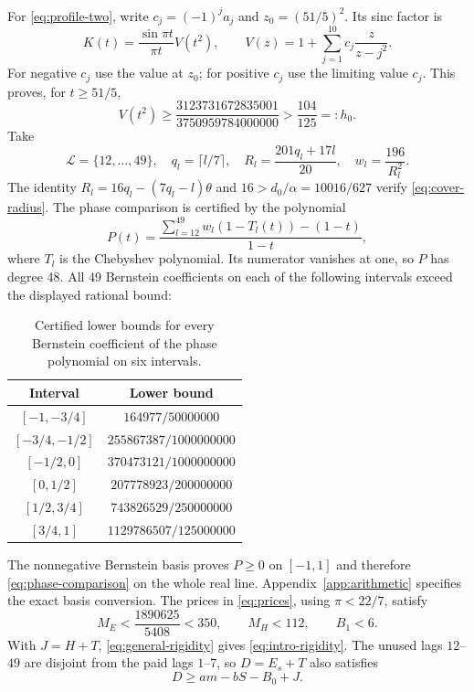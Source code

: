 \documentclass[11pt,reqno]{amsart}
\numberwithin{equation}{section}
\begin{document}
For \eqref{eq:profile-two}, write $c_j=(-1)^ja_j$ and
$z_0=(51/5)^2$. Its sinc factor is
\[
 K(t)=\frac{\sin\pi t}{\pi t}V(t^2),\qquad
 V(z)=1+\sum_{j=1}^{10}c_j\frac{z}{z-j^2}.
\]
For negative $c_j$ use the value at $z_0$; for positive $c_j$ use
the limiting value $c_j$. This proves, for $t\ge51/5$,
\begin{equation}
 V(t^2)\ge\frac{3123731672835001}{3750959784000000}
 >\frac{104}{125}=:h_0.
 \label{eq:tail-factor}
\end{equation}
Take
\begin{equation}
 \mathcal L=\{12,\ldots,49\},\quad q_l=\lceil l/7\rceil,\quad
 R_l=\frac{201q_l+17l}{20},\quad
 w_l=\frac{196}{R_l^2}.
 \label{eq:lag-data}
\end{equation}
The identity $R_l=16q_l-(7q_l-l)\theta$ and
$16>d_0/\alpha=10016/627$ verify \eqref{eq:cover-radius}.
The phase comparison is certified by the polynomial
\begin{equation}
 P(t)=\frac{\sum_{l=12}^{49}w_l(1-T_l(t))-(1-t)}{1-t},
 \label{eq:phase-polynomial}
\end{equation}
where $T_l$ is the Chebyshev polynomial. Its numerator vanishes at one,
so $P$ has degree 48. All 49 Bernstein coefficients on each of the
following intervals exceed the displayed rational bound:
\begin{table}[htbp]
\centering
\caption{Certified lower bounds for every Bernstein coefficient of the
phase polynomial on six intervals.}
\label{tab:phase-bounds}
\begin{tabular}{cc}
\toprule Interval & Lower bound\\\midrule
$[-1,-3/4]$ & $164977/50000000$\\
$[-3/4,-1/2]$ & $255867387/1000000000$\\
$[-1/2,0]$ & $370473121/1000000000$\\
$[0,1/2]$ & $207778923/200000000$\\
$[1/2,3/4]$ & $743826529/250000000$\\
$[3/4,1]$ & $1129786507/125000000$\\\bottomrule
\end{tabular}
\end{table}
The nonnegative Bernstein basis proves $P\ge0$ on $[-1,1]$ and
therefore \eqref{eq:phase-comparison} on the whole real line.
Appendix~\ref{app:arithmetic} specifies the exact basis conversion.
The prices in \eqref{eq:prices}, using $\pi<22/7$, satisfy
\begin{equation}
 M_E<\frac{1890625}{5408}<350,\qquad
 M_H<112,\qquad B_1<6.
 \label{eq:frozen-prices}
\end{equation}
With $J=H+T$, \eqref{eq:general-rigidity} gives
\eqref{eq:intro-rigidity}. The unused lags $12$--$49$ are disjoint
from the paid lags $1$--$7$, so $D=E_s+T$ also satisfies
\begin{equation}
 D\ge am-bS-B_0+J.
 \label{eq:retained-J}
\end{equation}
\end{document}
